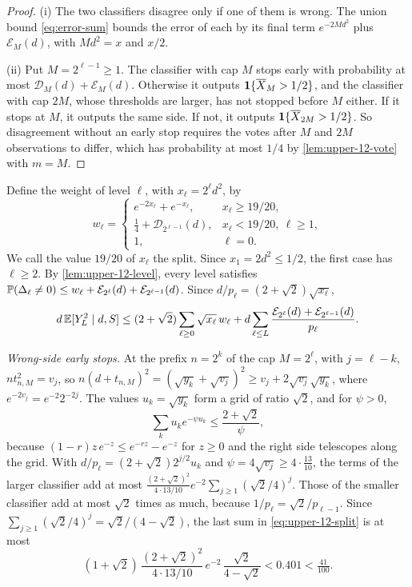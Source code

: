 \begin{proof}
(i) The two classifiers disagree only if one of them is wrong. The union
bound \eqref{eq:error-sum} bounds the error of each by its final term
$e^{-2Md^2}$ plus $\mathcal E_M(d)$, with $Md^2=x$ and $x/2$.

(ii) Put $M=2^{\ell-1}\ge1$. The classifier with cap $M$ stops early with
probability at most $\mathcal D_M(d)+\mathcal E_M(d)$. Otherwise it
outputs $\mathbf 1\{\overline X_M>1/2\}$, and the classifier with cap $2M$,
whose thresholds are larger, has not stopped before $M$ either. If it
stops at $M$, it outputs the same side. If not, it outputs
$\mathbf 1\{\overline X_{2M}>1/2\}$. So disagreement without an early stop
requires the votes after $M$ and $2M$ observations to differ, which has
probability at most $1/4$ by \cref{lem:upper-12-vote} with $m=M$.
\end{proof}

Define the weight of level $\ell$, with $x_\ell=2^\ell d^2$, by
\[
 w_\ell=\begin{cases}
 e^{-2x_\ell}+e^{-x_\ell},& x_\ell\ge19/20,\\
 \tfrac14+\mathcal D_{2^{\ell-1}}(d),& x_\ell<19/20,\ \ell\ge1,\\
 1,&\ell=0.\end{cases}
\]
We call the value $19/20$ of $x_\ell$ the split. Since $x_1=2d^2\le1/2$,
the first case has $\ell\ge2$. By
\cref{lem:upper-12-level}, every level satisfies
$\mathbb P(\Delta_\ell\ne0)\le w_\ell+\mathcal E_{2^\ell}(d)
+\mathcal E_{2^{\ell-1}}(d)$. Since $d/p_\ell=(2+\sqrt2)\sqrt{x_\ell}$,
\begin{equation}\label{eq:upper-12-split}
 d\,\mathbb E[Y_L^2\mid d,S]\le(2+\sqrt2)\sum_{\ell\ge0}\sqrt{x_\ell}\,w_\ell
 +d\sum_{\ell\le L}\frac{\mathcal E_{2^\ell}(d)+\mathcal E_{2^{\ell-1}}(d)}
 {p_\ell}.
\end{equation}

\emph{Wrong-side early stops.} At the prefix $n=2^k$ of the cap
$M=2^\ell$, with $j=\ell-k$, $nt_{n,M}^2=v_j$, so
$n(d+t_{n,M})^2=(\sqrt{y_k}+\sqrt{v_j})^2\ge v_j+2\sqrt{v_j}\sqrt{y_k}$,
where $e^{-2v_j}=e^{-2}2^{-2j}$. The values $u_k=\sqrt{y_k}$ form a grid
of ratio $\sqrt2$, and for $\psi>0$,
\[
 \sum_ku_ke^{-\psi u_k}\le\frac{2+\sqrt2}{\psi},
\]
because $(1-r)z\,e^{-z}\le e^{-rz}-e^{-z}$ for $z\ge0$ and the right
side telescopes along the grid. With $d/p_\ell=(2+\sqrt2)2^{j/2}u_k$ and
$\psi=4\sqrt{v_j}\ge4\cdot\tfrac{13}{10}$, the terms of the larger classifier
add at most
$\tfrac{(2+\sqrt2)^2}{4\cdot13/10}e^{-2}\sum_{j\ge1}(\sqrt2/4)^j$. Those
of the smaller classifier add at most $\sqrt2$ times as much, because
$1/p_\ell=\sqrt2/p_{\ell-1}$. Since
$\sum_{j\ge1}(\sqrt2/4)^j=\sqrt2/(4-\sqrt2)$, the last sum in
\eqref{eq:upper-12-split} is at most
\[
 (1+\sqrt2)\,\frac{(2+\sqrt2)^2}{4\cdot13/10}\,e^{-2}\,
 \frac{\sqrt2}{4-\sqrt2}<0.401<\tfrac{41}{100}.
\]

